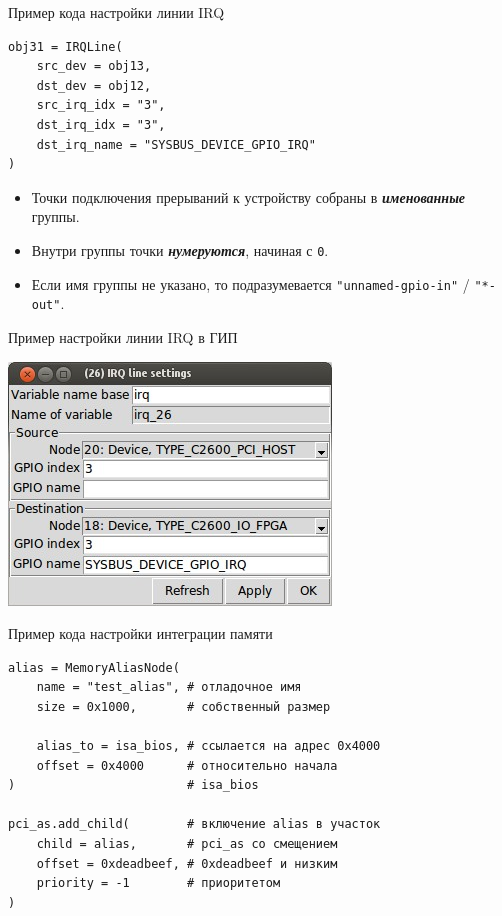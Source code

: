 \documentclass[unicode,hyperref={unicode=true}]{beamer}
\theoremstyle{definition}
\theoremstyle{plain}
\begin{document}
\begin{frame}[fragile]{Пример кода настройки линии IRQ}
\lstset{language=Python}
\begin{lstlisting}
obj31 = IRQLine(
    src_dev = obj13,
    dst_dev = obj12,
    src_irq_idx = "3",
    dst_irq_idx = "3",
    dst_irq_name = "SYSBUS_DEVICE_GPIO_IRQ"
)
\end{lstlisting}
\vfill
\begin{itemize}
\item Точки подключения прерываний к устройству собраны в
\textit{\textbf{именованные}}
группы.
\item Внутри группы точки \textit{\textbf{нумеруются}}, начиная с \texttt{0}.
\item Если имя группы не указано, то подразумевается
\texttt{"unnamed-gpio-in"} / \texttt{"*-out"}.
\end{itemize}
\end{frame}



\begin{frame}{Пример настройки линии IRQ в ГИП}
\begin{center}
\includegraphics[height=0.8\textheight]{irq_widget.jpg}
\end{center}
\end{frame}



\begin{frame}[fragile]{Пример кода настройки интеграции памяти}
\lstset{language=Python}
\begin{lstlisting}
alias = MemoryAliasNode(
    name = "test_alias", # отладочное имя
    size = 0x1000,       # собственный размер

    alias_to = isa_bios, # cсылается на адрес 0x4000
    offset = 0x4000      # относительно начала
)                        # isa_bios

pci_as.add_child(        # включение alias в участок
    child = alias,       # pci_as со смещением
    offset = 0xdeadbeef, # 0xdeadbeef и низким
    priority = -1        # приоритетом
)
\end{lstlisting}
\end{frame}
\end{document}
